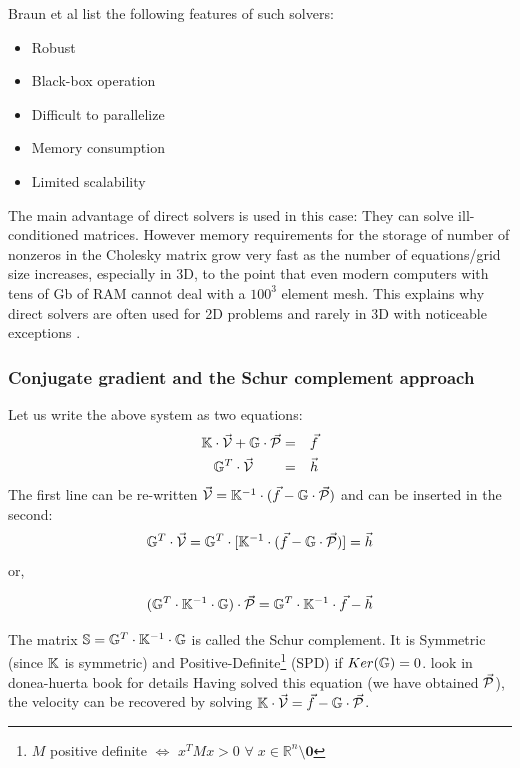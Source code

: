 Braun et al \cite{brtf08} list the following features of such solvers:
\begin{itemize}
\item Robust
\item Black-box operation
\item Difficult to parallelize
\item Memory consumption
\item Limited scalability
\end{itemize}

The main advantage of direct solvers is used in this case: They can solve ill-conditioned 
matrices. However memory requirements for the storage of number of nonzeros in the 
Cholesky matrix grow very fast as the number of equations/grid size increases, especially in 3D,
to the point that even modern computers with tens of Gb of RAM cannot deal with a $100^3$ element mesh.
This explains why direct solvers are often used for 2D problems and rarely in 3D with noticeable 
exceptions \cite{thfb08,yahb09,brya10,lobh10,alht11,alht12,alhf13,whbb14,neew18}. 


\subsubsection{Conjugate gradient and the Schur complement approach }






Let us write the above system as two equations:
\begin{eqnarray}
{\mathbb{K}} \cdot \vec{\cal V} + {\mathbb{G}} \cdot \vec{\cal P} &=& \vec{f} \\
{\mathbb{G}}^T \cdot  \vec{\cal V} \quad\quad &=& \vec{h} 
\end{eqnarray}
The first line can be re-written $\vec{\cal V}={\mathbb{K}}^{-1}\cdot (\vec{f} - {\mathbb{G}} \cdot \vec{\cal P})$ and can be inserted in the second:
\begin{equation}
{\mathbb{G}}^T\cdot \vec{\cal V} ={\mathbb{G}}^T \cdot  [ {\mathbb{K}}^{-1} \cdot  (\vec{f} - {\mathbb{G}} \cdot  \vec{\cal P}) ] = \vec{h} 
\end{equation}
or, 
\begin{mdframed}[backgroundcolor=blue!5]
\begin{equation}
({\mathbb{G}}^T \cdot {\mathbb{K}}^{-1} \cdot {\mathbb{G}}) \cdot \vec{\cal P} = {\mathbb{G}}^T \cdot {\mathbb{K}}^{-1}\cdot \vec{f} - \vec{h} 
\end{equation}
\end{mdframed}
The matrix ${\mathbb{S}}= {\mathbb{G}}^T \cdot {\mathbb{K}}^{-1} \cdot {\mathbb{G}} $ is called the Schur complement.  
It is Symmetric (since ${\mathbb{K}}$ is symmetric) and  Positive-Definite\footnote{$M$ 
positive definite $\iff$ $x^TMx>0$ $\forall \; x\in \mathbb{R}^n \setminus {\bm 0}$ }
(SPD)  if $Ker({{\mathbb{G}}})=0$. 
{\color{red} look in donea-huerta book for details}
Having solved this equation (we have obtained $\vec{\cal P}$), the velocity can be recovered by solving 
${\mathbb{K}}\cdot \vec{\cal V} =\vec{f}- {\mathbb{G}} \cdot \vec{\cal P}$. 

